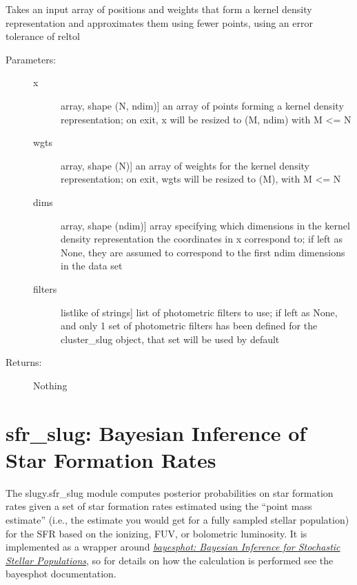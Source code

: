 \documentclass[letterpaper,10pt,english]{sphinxmanual}
\begin{document}
\begin{fulllineitems}
\begin{fulllineitems}
\label{cluster_slug:slugpy.cluster_slug.cluster_slug.squeeze_rep}
Takes an input array of positions and weights that form a
kernel density representation and approximates them using
fewer points, using an error tolerance of reltol
\begin{description}
\item[{Parameters:}] \leavevmode\begin{description}
\item[{x}] \leavevmode{[}array, shape (N, ndim){]}
an array of points forming a kernel density
representation; on exit, x will be resized to (M, ndim)
with M \textless{}= N

\item[{wgts}] \leavevmode{[}array, shape (N){]}
an array of weights for the kernel density
representation; on exit, wgts will be resized to (M),
with M \textless{}= N

\item[{dims}] \leavevmode{[}array, shape (ndim){]}
array specifying which dimensions in the kernel density
representation the coordinates in x correspond to; if
left as None, they are assumed to correspond to the
first ndim dimensions in the data set

\item[{filters}] \leavevmode{[}listlike of strings{]}
list of photometric filters to use; if left as None, and
only 1 set of photometric filters has been defined for
the cluster\_slug object, that set will be used by
default

\end{description}

\item[{Returns:}] \leavevmode
Nothing

\end{description}

\end{fulllineitems}


\end{fulllineitems}



\chapter{sfr\_slug: Bayesian Inference of Star Formation Rates}
\label{sfr_slug:sfr-slug-bayesian-inference-of-star-formation-rates}\label{sfr_slug::doc}\label{sfr_slug:sec-sfr-slug}
The slugy.sfr\_slug module computes posterior probabilities on star formation rates given a set of star formation rates estimated using the ``point mass estimate'' (i.e., the estimate you would get for a fully sampled stellar population) for the SFR based on the ionizing, FUV, or bolometric luminosity. It is implemented as a wrapper around {\hyperref[bayesphot:sec-bayesphot]{\emph{bayesphot: Bayesian Inference for Stochastic Stellar Populations}}}, so for details on how the calculation is performed see the bayesphot documentation.
\end{document}

